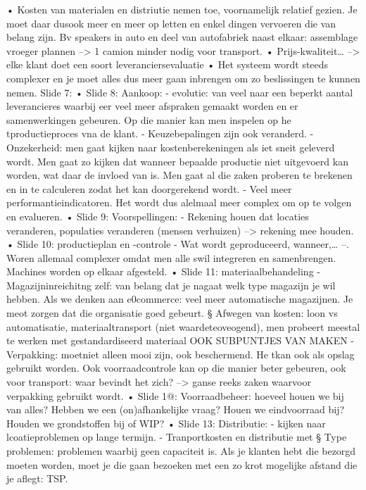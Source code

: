 \documentclass[10pt,a4paper]{report}
\begin{document}
	• Kosten van materialen en distriutie nemen toe, voornamelijk relatief gezien. Je moet daar dusook meer en meer op letten en enkel dingen vervoeren die van belang zijn. Bv speakers in auto en deel van autofabriek naast elkaar: assemblage vroeger plannen --> 1 camion minder nodig voor transport.
	• Prijs-kwaliteit… --> elke klant doet een soort leveranciersevaluatie
	• Het systeem wordt steeds complexer en je moet alles dus meer gaan inbrengen om zo beslissingen te kunnen nemen. 
Slide 7: 
	• Slide 8: Aankoop:
		-  evolutie: van veel naar een beperkt aantal leverancieres waarbij eer veel meer afspraken gemaakt worden en er samenwerkingen gebeuren. Op die manier kan men inspelen op he tproductieproces vna de klant.
		- Keuzebepalingen zijn ook veranderd.
		- Onzekerheid: men gaat kijken naar kostenberekeningen als iet sneit geleverd wordt. Men gaat zo kijken dat wanneer bepaalde productie niet uitgevoerd kan worden, wat daar de invloed van is. Men gaat al die zaken proberen te brekenen en in te calculeren zodat het kan doorgerekend wordt.
		- Veel meer performantieindicatoren. Het wordt dus alelmaal meer complex om op te volgen en evalueren.
	• Slide 9: Voorspellingen:
		- Rekening houen dat locaties veranderen, populaties veranderen (mensen verhuizen) --> rekening mee houden. 
	• Slide 10: productieplan en -controle
		- Wat wordt geproduceerd, wanneer,… --. Woren allemaal complexer omdat men alle swil integreren en samenbrengen. Machines worden op elkaar afgesteld. 
	• Slide 11: materiaalbehandeling
		- Magazijninreichitng zelf: van belang dat je nagaat welk type magazijn je wil hebben. Als we denken aan e0commerce: veel meer automatische magazijnen. Je meot zorgen dat die organisatie goed gebeurt. 
			§ Afwegen van kosten: loon vs automatisatie, materiaaltransport (niet waardeteoveogend), men probeert meestal te werken met gestandardiseerd materiaal OOK SUBPUNTJES VAN MAKEN
		- Verpakking: moetniet alleen mooi zijn, ook beschermend. He tkan ook als opslag gebruikt worden. Ook voorraadcontrole kan op die manier beter gebeuren, ook voor transport: waar bevindt het zich? --> ganse reeks zaken waarvoor verpakking gebruikt wordt.
	• Slide 1@: Voorraadbeheer: hoeveel houen we bij van alles? Hebben we een (on)afhankelijke vraag? Houen we eindvoorraad bij? Houden we grondstoffen bij of WIP? 
	• Slide 13: Distributie: 
		- kijken naar lcoatieproblemen op lange termijn.
		- Tranportkosten en distributie met 
			§ Type problemen: problemen waarbij geen capaciteit is. Als je klanten hebt die bezorgd moeten worden, moet je die gaan bezoeken met een zo krot mogelijke afstand die je aflegt: TSP.
			
\end{document}

